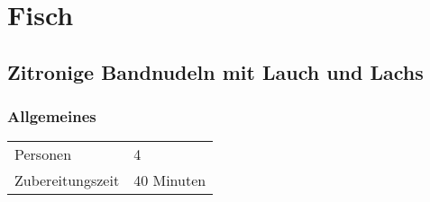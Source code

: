 \section{Fisch}

\subsection{Zitronige Bandnudeln mit Lauch und Lachs}\label{sec:Lachs:LauchBandnudeln}
\subsubsection*{Allgemeines}
\begin{tabular}{ll}
    Personen         &  4   \\
    Zubereitungszeit & 40 Minuten  \\
\end{tabular} 
